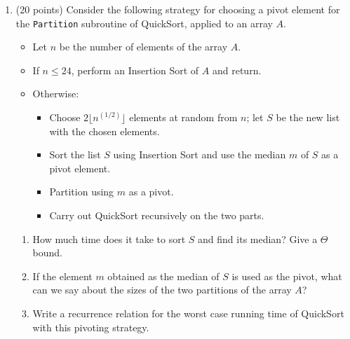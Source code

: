 \documentclass[12pt]{article}
\begin{document}
\begin{enumerate}
    \item (20 points) Consider the following strategy for choosing a pivot element for the {\tt Partition} subroutine of QuickSort, applied to an array $A$.
    \begin{itemize}
    	\item Let $n$ be the number of elements of the array $A$.
    	\item If $n\leq 24$, perform an Insertion Sort of $A$ and return.
    	\item Otherwise:
    	\begin{itemize}
    		\item Choose $2\lfloor n^{(1/2)} \rfloor$ elements at random from $n$; let $S$ be the new list with the chosen elements.
    		\item Sort the list $S$ using Insertion Sort and use the median $m$ of $S$ as a pivot element.
    		\item Partition using $m$ as a pivot.
    		\item Carry out QuickSort recursively on the two parts.
    	\end{itemize}
    \end{itemize}
    \begin{enumerate}
    	\item How much time does it take to sort $S$ and find its median? Give a $\Theta$ bound.
    	\item If the element $m$ obtained as the median of $S$ is used as the pivot, what can we say about the sizes of the two partitions of the array $A$?
    	\item Write a recurrence relation for the worst case running time of QuickSort with this pivoting strategy.
    \end{enumerate}

\end{enumerate}
\end{document}
